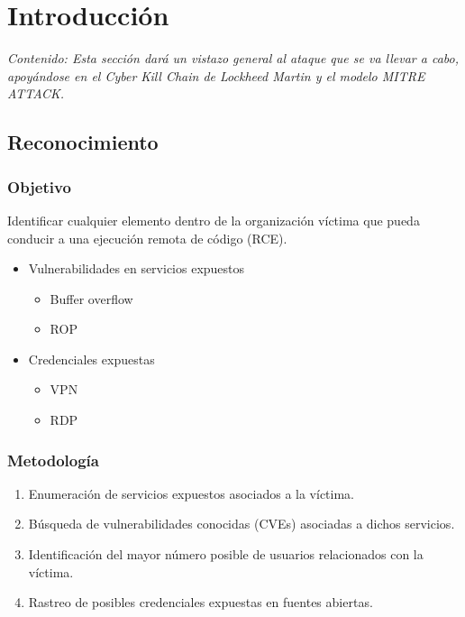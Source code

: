 \chapter{Introducción}

\textit{Contenido: Esta sección dará un vistazo general al ataque que se va llevar a cabo, 
apoyándose en el Cyber Kill Chain de Lockheed Martin y el modelo MITRE ATTACK.}
\vspace{1em}

\section{Reconocimiento}

\subsection{Objetivo}

Identificar cualquier elemento dentro de la organización víctima que pueda 
conducir a una ejecución remota de código (RCE).

\begin{itemize}
    \item Vulnerabilidades en servicios expuestos
    \begin{itemize}
        \item Buffer overflow
        \item ROP
    \end{itemize}
    \item Credenciales expuestas
    \begin{itemize}
        \item VPN
        \item RDP
    \end{itemize}
\end{itemize}

\subsection{Metodología}

\begin{enumerate}
    \item Enumeración de servicios expuestos asociados a la víctima.
    \item Búsqueda de vulnerabilidades conocidas (CVEs) asociadas a dichos servicios.
    \item Identificación del mayor número posible de usuarios relacionados con la víctima.
    \item Rastreo de posibles credenciales expuestas en fuentes abiertas.
\end{enumerate}

